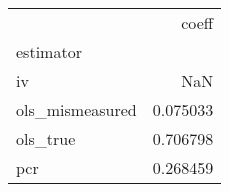 \begin{tabular}{lr}
\toprule
{} &     coeff \\
estimator       &           \\
\midrule
iv              &       NaN \\
ols\_mismeasured &  0.075033 \\
ols\_true        &  0.706798 \\
pcr             &  0.268459 \\
\bottomrule
\end{tabular}
